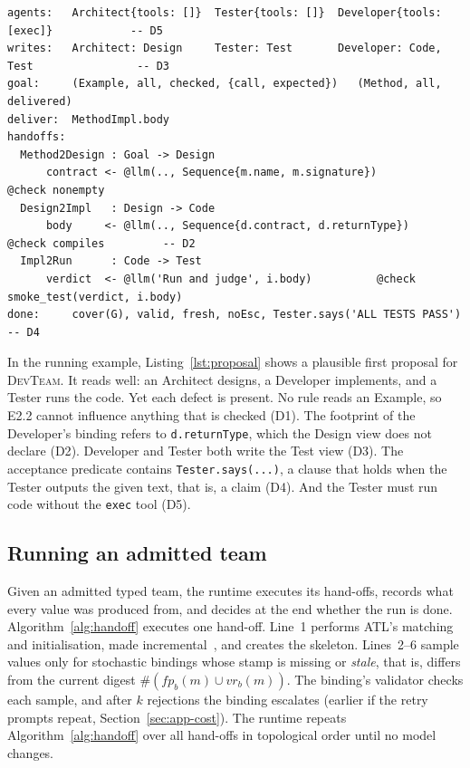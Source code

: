 \documentclass[pdflatex,sn-mathphys-num]{sn-jnl}
\theoremstyle{thmstyleone}%
\theoremstyle{thmstyletwo}%
\theoremstyle{thmstylethree}%
\newcommand{\devteam}{\textsc{DevTeam}}
\newcommand{\D}[1]{\textsf{D#1}}
\newcommand{\fp}{\mathit{fp}}
\newcommand{\cls}[1]{\textsf{#1}}
\newcommand{\code}[1]{\texttt{#1}}
\begin{document}
\begin{lstlisting}[float=tb, style=model, language=ATL, caption={An illustrative first proposal of a typed \devteam{}, written with its wiring (without wiring inference) and shown in a concise textual syntax. Its views (not shown) differ from those of Section~\ref{sec:app-handoffs} in that Test declares a class \code{TestRun} with an attribute \code{verdict}. It contains one instance of each defect \D{1}--\D{5}.}, label={lst:proposal}]
agents:   Architect{tools: []}  Tester{tools: []}  Developer{tools: [exec]}            -- D5
writes:   Architect: Design     Tester: Test       Developer: Code, Test                -- D3
goal:     (Example, all, checked, {call, expected})   (Method, all, delivered)
deliver:  MethodImpl.body
handoffs:
  Method2Design : Goal -> Design
      contract <- @llm(.., Sequence{m.name, m.signature})        @check nonempty
  Design2Impl   : Design -> Code
      body     <- @llm(.., Sequence{d.contract, d.returnType})   @check compiles         -- D2
  Impl2Run      : Code -> Test
      verdict  <- @llm('Run and judge', i.body)          @check smoke_test(verdict, i.body)
done:     cover(G), valid, fresh, noEsc, Tester.says('ALL TESTS PASS')                  -- D4
\end{lstlisting}

In the running example, Listing~\ref{lst:proposal} shows a plausible first
proposal for \devteam{}. It reads well: an Architect designs, a Developer
implements, and a Tester runs the code. Yet each defect is present. No rule
reads an \cls{Example}, so E2.2 cannot influence anything that is checked
(\D{1}). The footprint of the Developer's binding refers to
\code{d.returnType}, which the Design view does not declare (\D{2}). Developer
and Tester both write the Test view (\D{3}). The acceptance predicate contains
\code{Tester.says(...)}, a clause that holds when the Tester outputs the given
text, that is, a claim (\D{4}). And the Tester must run code without the
\code{exec} tool (\D{5}).

\subsection{Running an admitted team}\label{sec:app-runtime}

Given an admitted typed team, the runtime executes its hand-offs, records what
every value was produced from, and decides at the end whether the run is done.
Algorithm~\ref{alg:handoff} executes one hand-off. Line~1 performs ATL's
matching and initialisation, made incremental~\cite{jouault2010incremental},
and creates the skeleton. Lines~2--6 sample values only for stochastic bindings
whose stamp is missing or \emph{stale}, that is, differs from the current
digest $\#(\fp_b(m)\cup\mathit{vr}_b(m))$. The binding's validator checks
each sample, and after $k$ rejections the binding escalates (earlier if the
retry prompts repeat, Section~\ref{sec:app-cost}). The runtime repeats
Algorithm~\ref{alg:handoff} over all hand-offs in topological order until no
model changes.
\end{document}
